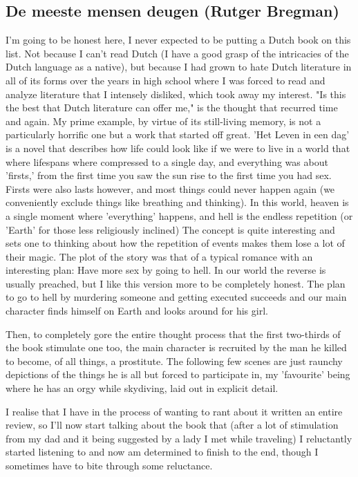 \subsection{De meeste mensen deugen (Rutger Bregman)}

I'm going to be honest here, I never expected to be putting a Dutch book on this list. Not because I can't read Dutch 
(I have a good grasp of the intricacies of the Dutch language as a native), but because I had grown to hate Dutch literature in all of its forms over the years in high school where I was forced to read and analyze literature that I intensely disliked, which took away my interest. "Is this the best that Dutch literature can offer me," is the thought that recurred time and again. 
My prime example, by virtue of its still-living memory, is not a particularly horrific one but a work that started off great. 'Het Leven in een dag' is a novel that describes how life could look like if we were to live in a world that where lifespans where compressed to a single day, and everything was about 'firsts,' from the first time you saw the sun rise to the first time you had sex. Firsts were also lasts however, and most things could never happen again (we conveniently exclude things like breathing and thinking). In this world, heaven is a single moment where 'everything' happens, and hell is the endless repetition (or 'Earth' for those less religiously inclined) The concept is quite interesting and sets one to thinking about how the repetition of events makes them lose a lot of their magic. The plot of the story was that of a typical romance with an interesting plan: Have more sex by going to hell. In our world the reverse is usually preached, but I like this version more to be completely honest. The plan to go to hell by murdering someone and getting executed succeeds and our main character finds himself on Earth and looks around for his girl.

Then, to completely gore the entire thought process that the first two-thirds of the book stimulate one too, the main character is recruited by the man he killed to become, of all things, a prostitute. The following few scenes are just raunchy depictions of the things he is all but forced to participate in, my 'favourite' being where he has an orgy while skydiving, laid out in explicit detail. 

I realise that I have in the process of wanting to rant about it written an entire review, so I'll now start talking about the book that (after a lot of stimulation from my dad and it being suggested by a lady I met while traveling) I reluctantly started listening to and now am determined to finish to the end, though I sometimes have to bite through some reluctance. 

